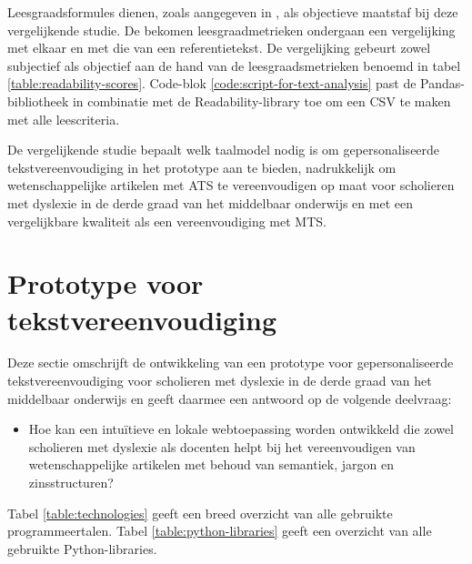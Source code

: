 Leesgraadsformules dienen, zoals aangegeven in \textcite{Nenkova2004}, als objectieve maatstaf bij deze vergelijkende studie. De bekomen leesgraadmetrieken ondergaan een vergelijking met elkaar en met die van een referentietekst. De vergelijking gebeurt zowel subjectief als objectief aan de hand van de leesgraadsmetrieken benoemd in tabel \ref{table:readability-scores}. Code-blok \ref{code:script-for-text-analysis} past de Pandas-bibliotheek in combinatie met de Readability-library toe om een CSV te maken met alle leescriteria.

\medspace

De vergelijkende studie bepaalt welk taalmodel nodig is om gepersonaliseerde tekstvereenvoudiging in het prototype aan te bieden, nadrukkelijk om wetenschappelijke artikelen met ATS te vereenvoudigen op maat voor scholieren met dyslexie in de derde graad van het middelbaar onderwijs en met een vergelijkbare kwaliteit als een vereenvoudiging met MTS. 

\section{Prototype voor tekstvereenvoudiging}

Deze sectie omschrijft de ontwikkeling van een prototype voor gepersonaliseerde tekstvereenvoudiging voor scholieren met dyslexie in de derde graad van het middelbaar onderwijs en geeft daarmee een antwoord op de volgende deelvraag: 

\begin{itemize}
	\item Hoe kan een intuïtieve en lokale webtoepassing worden ontwikkeld die zowel scholieren met dyslexie als docenten helpt bij het vereenvoudigen van wetenschappelijke artikelen met behoud van semantiek, jargon en zinsstructuren?
\end{itemize}

\medspace

Tabel \ref{table:technologies} geeft een breed overzicht van alle gebruikte programmeertalen. Tabel \ref{table:python-libraries} geeft een overzicht van alle gebruikte Python-libraries.

